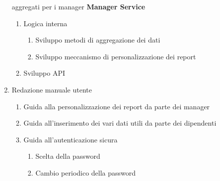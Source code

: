 \documentclass{article}
\begin{document}
\begin{enumerate}
        aggregati per i manager \textbf{Manager Service}
        \begin{enumerate}
            \item Logica interna
            \begin{enumerate}
                \item Sviluppo metodi di aggregazione dei dati
                \item Sviluppo meccanismo di personalizzazione dei report   
            \end{enumerate}
            \item Sviluppo API
        \end{enumerate}
    \item Redazione manuale utente
    \begin{enumerate}
        \item Guida alla personalizzazione dei report da parte dei manager
        \item Guida all'inserimento dei vari dati utili da parte dei dipendenti
        \item Guida all'autenticazione sicura
        \begin{enumerate}
            \item Scelta della password
            \item Cambio periodico della password
        \end{enumerate}
    \end{enumerate}
    \end{enumerate}


 
\end{document}
